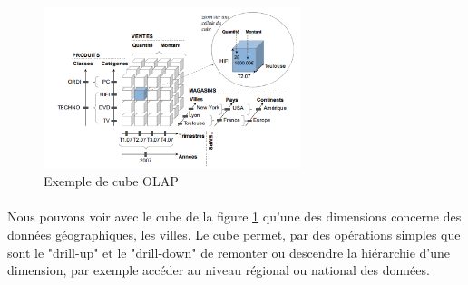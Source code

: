 \begin{figure}[!htp]
  \centering
  \includegraphics[width=75mm]{./src_img/exempleOLAPCube.png}
  \caption{Exemple de cube OLAP\supercite{tel-01456620}}
  \label{fig:olapcube}
\end{figure}

\paragraph{}Nous pouvons voir avec le cube de la figure \ref{fig:olapcube} qu'une des dimensions concerne des données géographiques, les villes. Le cube permet, par des opérations simples que sont le "drill-up" et le "drill-down" de remonter ou descendre la hiérarchie d'une dimension, par exemple accéder au niveau régional ou national des données.

